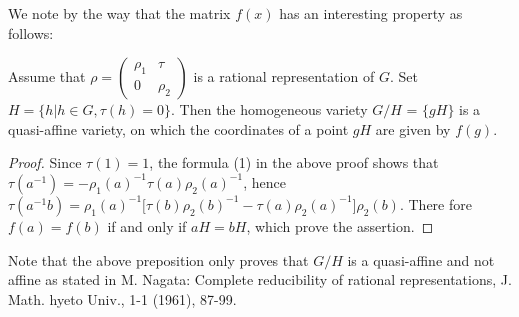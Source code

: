   We note by the way that the matrix $f(x)$ has an interesting
  property as follows: 

\begin{prop*}
  Assume that $ \rho = \begin{pmatrix} \rho_1 & \tau\\ 0 &
    \rho_2 \end{pmatrix}$ is a rational representation of $G$. Set $H
  =\{ h|h \in G, \tau (h)=0\}$. Then the homogeneous variety $G/H$ = $ \{ 
  gH\}$ is a quasi-affine variety, on which the coordinates of a
  point $gH$ are given by $f(g)$. 
\end{prop*}

\begin{proof}
  Since $\tau(1) =1$, the formula (1) in the above proof shows that $ \tau
  (a^{-1}) =-\rho _1 (a)^{-1} \tau(a) \rho _2(a)^{-1}$, hence $\tau (a^{-1}b)
  = \rho_1(a)^{-1} \bigg[\tau(b)\rho_2 (b) ^{-1}-\tau(a) \rho
    _2(a)^{-1}\bigg] \rho_2 (b)$. There fore $f(a)=f(b)$ if and only
  if $aH=bH$, which prove the assertion. 
\end{proof}

\begin{remark*}
  Note that the above preposition only proves that $G/H$ is a
  quasi-affine and not affine as stated in M. Nagata: Complete
  reducibility of rational representations, J. Math. hyeto Univ.,
  1-1 (1961), 87-99. 
\end{remark*}
